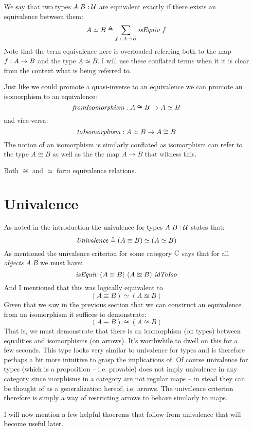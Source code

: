 We say that two types $A\;B \;\mathord{:}\; \mathcal{U}$ are equivalent exactly if there exists an
equivalence between them:
%
$$
A \simeq B \triangleq \sum_{f \;\mathord{:}\; A \to B} \mathit{isEquiv}\ f
$$
%
Note that the term equivalence here is overloaded referring both to the map $f
\;\mathord{:}\; A \to B$ and the type $A \simeq B$. I will use these conflated terms when it
it is clear from the context what is being referred to.

Just like we could promote a quasi-inverse to an equivalence we can promote an
isomorphism to an equivalence:
%
$$
\mathit{fromIsomorphism} \;\mathord{:}\; A \cong B \to A \simeq B
$$
%
and vice-versa:
%
$$
\mathit{toIsomorphism} \;\mathord{:}\; A \simeq B \to A \cong B
$$
%
The notion of an isomorphism is similarly conflated as isomorphism can refer to
the type $A \cong B$ as well as the the map $A \to B$ that witness this.

Both $\cong$ and $\simeq$ form equivalence relations.

\section{Univalence}
\label{univalence}
As noted in the introduction the univalence for types $A\; B \;\mathord{:}\; \mathcal{U}$ states
that:
%
$$
\mathit{Univalence} \triangleq (A \equiv B) \simeq (A \simeq B)
$$
%
As mentioned the univalence criterion for some category $\mathbb{C}$ says that for all
\emph{objects} $A\;B$ we must have:
$$
\mathit{isEquiv}\ (A \equiv B)\ (A \approxeq B)\ \mathit{idToIso}
$$
And I mentioned that this was logically equivalent to
%
$$
(A \equiv B) \simeq (A \approxeq B)
$$
%
Given that we saw in the previous section that we can construct an equivalence
from an isomorphism it suffices to demonstrate:
%
$$
(A \equiv B) \cong (A \approxeq B)
$$
%
That is, we must demonstrate that there is an isomorphism (on types) between
equalities and isomorphisms (on arrows). It's worthwhile to dwell on this for a
few seconds. This type looks very similar to univalence for types and is
therefore perhaps a bit more intuitive to grasp the implications of. Of course
univalence for types (which is a proposition -- i.e. provable) does not imply
univalence in any category since morphisms in a category are not regular maps --
in stead they can be thought of as a generalization hereof; i.e. arrows. The
univalence criterion therefore is simply a way of restricting arrows to behave
similarly to maps.

I will now mention a few helpful thoerems that follow from univalence that will
become useful later.


